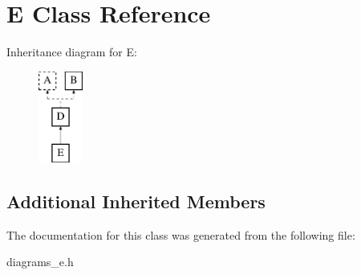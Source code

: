 \hypertarget{classE}{\section{E Class Reference}
\label{classE}
}
Inheritance diagram for E\-:\begin{figure}[H]
\begin{center}
\leavevmode
\includegraphics[height=3.000000cm]{classE}
\end{center}
\end{figure}
\subsection*{Additional Inherited Members}


The documentation for this class was generated from the following file\-:\begin{DoxyCompactItemize}
\item 
diagrams\-\_\-e.\-h\end{DoxyCompactItemize}
